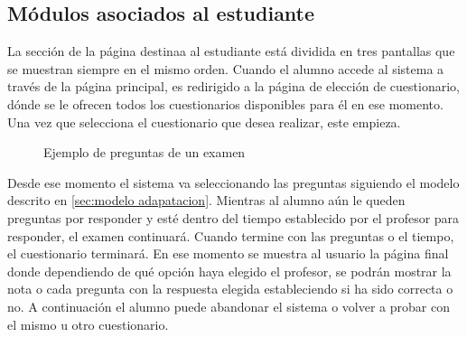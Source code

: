 \subsection{Módulos asociados al estudiante}

La sección de la página destinaa al estudiante está dividida en tres pantallas que se muestran siempre en el mismo orden. Cuando el alumno accede al sistema a través de la página principal, es redirigido a la página de elección de cuestionario, dónde se le ofrecen todos los cuestionarios disponibles para él en ese momento. Una vez que selecciona el cuestionario que desea realizar, este empieza.

\begin{figure}[!htp]
	\hfill
	\caption{Ejemplo de preguntas de un examen}
	\label{fig:e-valUAM examenes}
\end{figure}

Desde ese momento el sistema va seleccionando las preguntas siguiendo el modelo descrito en \ref{sec:modelo adapatacion}. Mientras al alumno aún le queden preguntas por responder y esté dentro del tiempo establecido por el profesor para responder, el examen continuará. Cuando termine con las preguntas o el tiempo, el cuestionario terminará. En ese momento se muestra al usuario la página final donde dependiendo de qué opción haya elegido el profesor, se podrán mostrar la nota o cada pregunta con la respuesta elegida estableciendo si ha sido correcta o no. A continuación el alumno puede abandonar el sistema o volver a probar con el mismo u otro cuestionario.

